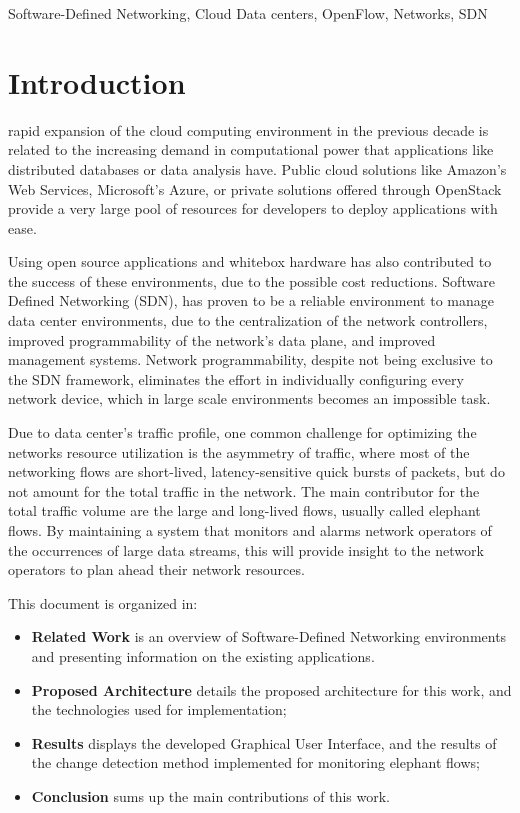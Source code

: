 \documentclass[a4paper]{IEEEtran}
\begin{document}
\begin{IEEEkeywords}
Software-Defined Networking, Cloud Data centers, OpenFlow, Networks, SDN
\end{IEEEkeywords}

\section{Introduction}

 rapid expansion of the cloud computing environment in the previous decade is related to the increasing demand in computational power that 
applications like distributed databases or data analysis have. Public cloud solutions like Amazon's Web Services, Microsoft's Azure, or private solutions offered
through OpenStack provide a very large pool of resources for developers to deploy applications with ease. 

\par Using open source applications and whitebox hardware has also contributed to the success of these environments, due to the possible cost reductions. Software
Defined Networking (SDN), has proven to be a reliable environment to manage data center environments, due to the centralization of the network
controllers, improved programmability of the network's data plane, and improved management systems. Network programmability, despite not being exclusive to the 
SDN framework, eliminates the effort in individually configuring every network device, which in large scale environments becomes an impossible task. 

\par Due to data center's traffic profile, one common challenge for optimizing the networks resource utilization is the asymmetry of traffic, where most of the 
networking flows are short-lived, latency-sensitive quick bursts of packets, but do not amount for the total traffic in the network. The main contributor for the 
total traffic volume are the large and long-lived flows, usually called elephant flows. By maintaining a system that monitors and alarms network operators of the
occurrences of large data streams, this will provide insight to the network operators to plan ahead their network resources.

\par This document is organized in:

\begin{itemize}
    \item \textbf{Related Work} is an overview of Software-Defined Networking environments and presenting information on the existing applications. 
    \item \textbf{Proposed Architecture} details the proposed architecture for this work, and the technologies used for implementation;
    \item \textbf{Results} displays the developed Graphical User Interface, and the results of the change detection method implemented for monitoring elephant flows;
    \item \textbf{Conclusion} sums up the main contributions of this work.
\end{itemize}
\end{document}
